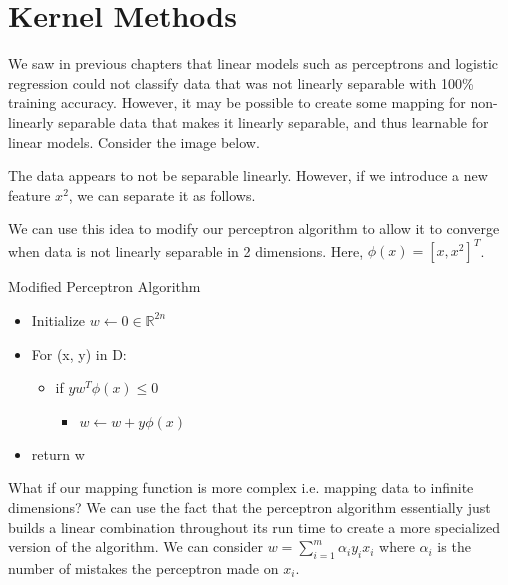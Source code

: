 \chapter{Kernel Methods}

We saw in previous chapters that linear models such as perceptrons and logistic regression could not classify data that was not linearly separable with 100\% training accuracy. However, it may be possible to create some mapping for non-linearly separable data that makes it linearly separable, and thus learnable for linear models. Consider the image below. 

\begin{center}
\end{center}

The data appears to not be separable linearly.  However, if we introduce a new feature $x^2$, we can separate it as follows.

\begin{center}
\end{center}

We can use this idea to modify our perceptron algorithm to allow it to converge when data is not linearly separable in 2 dimensions. Here, $\phi(x) = [x, x^2]^T$.

Modified Perceptron Algorithm
\begin{itemize}
    \item Initialize $w \leftarrow 0 \in \mathbb{R}^{2n}$
    \item For (x, y) in D:
    \begin{itemize}
        \item if $yw^T \phi(x) \leq 0$
        \begin{itemize}
            \item $w \leftarrow w + y \phi(x)$
        \end{itemize}
    \end{itemize}
    \item return w
\end{itemize}

\vspace{1cm}
What if our mapping function is more complex i.e. mapping data to infinite dimensions? We can use the fact that the perceptron algorithm essentially just builds a linear combination throughout its run time to create a more specialized version of the algorithm. We can consider $w = \sum_{i = 1}^{m} \alpha_i y_i x_i$ where $\alpha_i$ is the number of mistakes the perceptron made on $x_i$.

